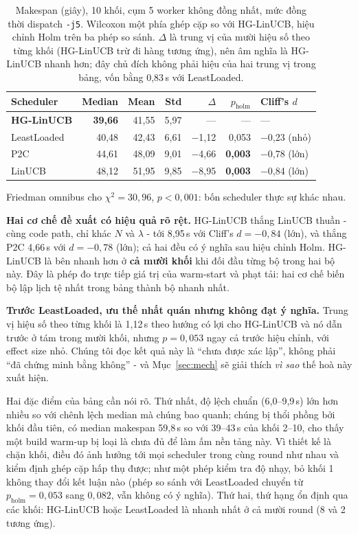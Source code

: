 \documentclass[final,5p,times,twocolumn]{elsarticle}
\begin{document}
\begin{table}[t]
\centering
\caption{Makespan (giây), 10 khối, cụm 5 worker không đồng nhất, mức đồng thời dispatch \texttt{-j5}. Wilcoxon một phía ghép cặp so với HG-LinUCB, hiệu chỉnh Holm trên ba phép so sánh. $\Delta$ là trung vị của mười hiệu số theo từng khối (HG-LinUCB trừ đi hàng tương ứng), nên âm nghĩa là HG-LinUCB nhanh hơn; đây chủ đích không phải hiệu của hai trung vị trong bảng, vốn bằng 0,83\,s với LeastLoaded.}
\label{tab:j5}
\small
\begin{tabular}{lrrrrrp{3.2cm}}
\toprule
Scheduler & Median & Mean & Std & $\Delta$ & $p_{\text{holm}}$ & Cliff's $d$ \\
\midrule
\textbf{HG-LinUCB} & \textbf{39,66} & 41,55 & 5,97 & --- & --- & --- \\
LeastLoaded & 40,48 & 42,43 & 6,61 & $-$1,12 & 0,053 & $-$0,23 (nhỏ) \\
P2C & 44,61 & 48,09 & 9,01 & $-$4,66 & \textbf{0,003} & $-$0,78 (lớn) \\
LinUCB & 48,12 & 51,95 & 9,85 & $-$8,95 & \textbf{0,003} & $-$0,84 (lớn) \\
\bottomrule
\end{tabular}
\end{table}

Friedman omnibus cho $\chi^2=30{,}96$, $p<0{,}001$: bốn scheduler thực sự khác nhau.

\textbf{Hai cơ chế đề xuất có hiệu quả rõ rệt.} HG-LinUCB thắng LinUCB thuần - cùng code path, chỉ khác $N$ và $\lambda$ - tới 8,95\,s với Cliff's $d=-0{,}84$ (lớn), và thắng P2C 4,66\,s với $d=-0{,}78$ (lớn); cả hai đều có ý nghĩa sau hiệu chỉnh Holm. HG-LinUCB là bên nhanh hơn ở \textbf{cả mười khối} khi đối đầu từng bộ trong hai bộ này. Đây là phép đo trực tiếp giá trị của warm-start và phạt tải: hai cơ chế biến bộ lập lịch tệ nhất trong bảng thành bộ nhanh nhất.

\textbf{Trước LeastLoaded, ưu thế nhất quán nhưng không đạt ý nghĩa.} Trung vị hiệu số theo từng khối là 1,12\,s theo hướng có lợi cho HG-LinUCB và nó dẫn trước ở tám trong mười khối, nhưng $p=0{,}053$ ngay cả trước hiệu chỉnh, với effect size nhỏ. Chúng tôi đọc kết quả này là ``chưa được xác lập'', không phải ``đã chứng minh bằng không'' - và Mục~\ref{sec:mech} sẽ giải thích \emph{vì sao} thế hoà này xuất hiện.

Hai đặc điểm của bảng cần nói rõ. Thứ nhất, độ lệch chuẩn (6,0--9,9\,s) lớn hơn nhiều so với chênh lệch median mà chúng bao quanh; chúng bị thổi phồng bởi khối đầu tiên, có median makespan 59,8\,s so với 39--43\,s của khối 2--10, cho thấy một build warm-up bị loại là chưa đủ để làm ấm nền tảng này. Vì thiết kế là chặn khối, điều đó ảnh hưởng tới mọi scheduler trong cùng round như nhau và kiểm định ghép cặp hấp thụ được; như một phép kiểm tra độ nhạy, bỏ khối 1 không thay đổi kết luận nào (phép so sánh với LeastLoaded chuyển từ $p_{\text{holm}}=0{,}053$ sang $0{,}082$, vẫn không có ý nghĩa). Thứ hai, thứ hạng ổn định qua các khối: HG-LinUCB hoặc LeastLoaded là nhanh nhất ở cả mười round (8 và 2 tương ứng).
\end{document}
